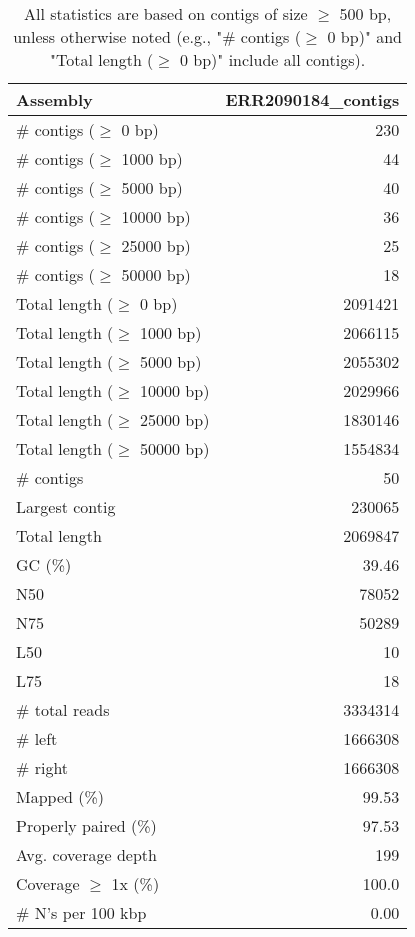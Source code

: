 \documentclass[12pt,a4paper]{article}
\begin{document}
\begin{table}[ht]
\begin{center}
\caption{All statistics are based on contigs of size $\geq$ 500 bp, unless otherwise noted (e.g., "\# contigs ($\geq$ 0 bp)" and "Total length ($\geq$ 0 bp)" include all contigs).}
\begin{tabular}{|l*{1}{|r}|}
\hline
Assembly & ERR2090184\_contigs \\ \hline
\# contigs ($\geq$ 0 bp) & 230 \\ \hline
\# contigs ($\geq$ 1000 bp) & 44 \\ \hline
\# contigs ($\geq$ 5000 bp) & 40 \\ \hline
\# contigs ($\geq$ 10000 bp) & 36 \\ \hline
\# contigs ($\geq$ 25000 bp) & 25 \\ \hline
\# contigs ($\geq$ 50000 bp) & 18 \\ \hline
Total length ($\geq$ 0 bp) & 2091421 \\ \hline
Total length ($\geq$ 1000 bp) & 2066115 \\ \hline
Total length ($\geq$ 5000 bp) & 2055302 \\ \hline
Total length ($\geq$ 10000 bp) & 2029966 \\ \hline
Total length ($\geq$ 25000 bp) & 1830146 \\ \hline
Total length ($\geq$ 50000 bp) & 1554834 \\ \hline
\# contigs & 50 \\ \hline
Largest contig & 230065 \\ \hline
Total length & 2069847 \\ \hline
GC (\%) & 39.46 \\ \hline
N50 & 78052 \\ \hline
N75 & 50289 \\ \hline
L50 & 10 \\ \hline
L75 & 18 \\ \hline
\# total reads & 3334314 \\ \hline
\# left & 1666308 \\ \hline
\# right & 1666308 \\ \hline
Mapped (\%) & 99.53 \\ \hline
Properly paired (\%) & 97.53 \\ \hline
Avg. coverage depth & 199 \\ \hline
Coverage $\geq$ 1x (\%) & 100.0 \\ \hline
\# N's per 100 kbp & 0.00 \\ \hline
\end{tabular}
\end{center}
\end{table}
\end{document}

